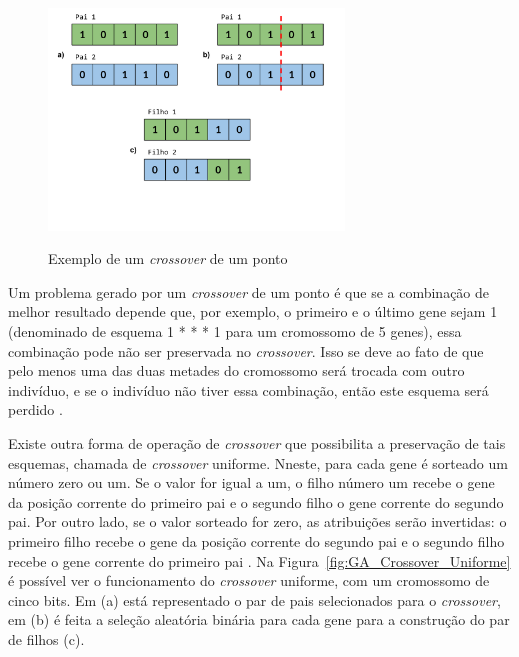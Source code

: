 \documentclass[12pt,oneside,a4paper,english,french,spanish,brazil,]{abntex2}
\begin{document}
\begin{figure}[ht]
\centering
\caption{Exemplo de um \textit{crossover} de um ponto}
\includegraphics[width=0.7\textwidth]{imagens/GA_Crossover_de_um_ponto.pdf}
\label{fig:GA_Crossover_de_um_ponto}
\end{figure}

Um problema gerado por um \textit{crossover} de um ponto é que se a combinação de melhor resultado depende que, por exemplo, o primeiro e o último gene sejam 1 (denominado de esquema 1 * * * 1 para um cromossomo de 5 genes), essa combinação pode não ser preservada no \textit{crossover}. Isso se deve ao fato de que pelo menos uma das duas metades do cromossomo será trocada com outro indivíduo, e se o indivíduo não tiver essa combinação, então este esquema será perdido \cite{linden:2008}.

Existe outra forma de operação de \textit{crossover} que possibilita a preservação de tais esquemas, chamada de \textit{crossover} uniforme. Nneste, para cada gene é sorteado um número zero ou um. Se o valor for igual a um, o filho número um recebe o gene da posição corrente do primeiro pai e o segundo filho o gene corrente do segundo pai. Por outro lado, se o valor sorteado for zero, as atribuições serão invertidas: o primeiro filho recebe o gene da posição corrente do segundo pai e o segundo filho recebe o gene corrente do primeiro pai \cite{linden:2008}. Na Figura~\ref{fig:GA_Crossover_Uniforme} é possível ver o funcionamento do \textit{crossover} uniforme, com um cromossomo de cinco bits. Em (a) está representado o par de pais selecionados para o \textit{crossover}, em (b) é feita a seleção aleatória binária para cada gene para a construção do par de filhos (c).
\end{document}
